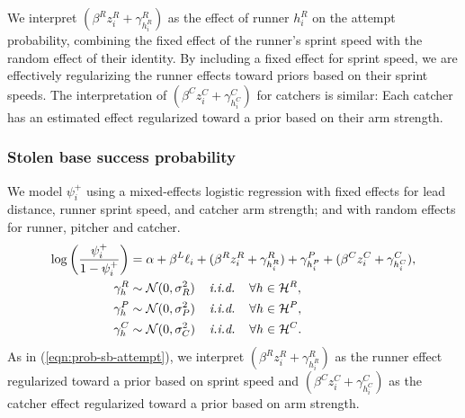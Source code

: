 \documentclass{article}
\begin{document}
        We interpret $(\beta^R z_i^R + \gamma^R_{h_i^R})$ as the effect of runner $h_i^R$ on the attempt probability, combining the fixed effect of the runner's sprint speed with the random effect of their identity. By including a fixed effect for sprint speed, we are effectively regularizing the runner effects toward priors based on their sprint speeds. The interpretation of $(\beta^C z_i^C + \gamma^C_{h_i^C})$ for catchers is similar: Each catcher has an estimated effect regularized toward a prior based on their arm strength.
      
      \subsubsection{Stolen base success probability}
      \label{sec:prob-sb-success}

        We model $\psi_i^+$ using a mixed-effects logistic regression with fixed effects for lead distance, runner sprint speed, and catcher arm strength; and with random effects for runner, pitcher and catcher.
        \begin{align}
          \label{eqn:prob-sb-success}
          \begin{split}
            \log\left(\frac{\psi_i^+}{1 - \psi_i^+}\right) &= \alpha + \beta^L \ell_i + (\beta^R z_i^R + \gamma^R_{h_i^R}) + \gamma^P_{h_i^P} + (\beta^C z_i^C + \gamma^C_{h_i^C}),\\
            \gamma^R_{h} &\sim \mathcal{N}(0, \sigma^2_R) \hspace{4mm} \mbox{\it i.i.d.} \hspace{4mm} \forall h \in \mathcal{H}^R,\\
            \gamma^P_{h} &\sim \mathcal{N}(0, \sigma^2_P) \hspace{4mm} \mbox{\it i.i.d.} \hspace{4mm} \forall h \in \mathcal{H}^P,\\
            \gamma^C_{h} &\sim \mathcal{N}(0, \sigma^2_C) \hspace{4mm} \mbox{\it i.i.d.} \hspace{4mm} \forall h \in \mathcal{H}^C.
          \end{split}
        \end{align}
        As in (\ref{eqn:prob-sb-attempt}), we interpret $(\beta^R z_i^R + \gamma^R_{h_i^R})$ as the runner effect regularized toward a prior based on sprint speed and $(\beta^C z_i^C + \gamma^C_{h_i^C})$ as the catcher effect regularized toward a prior based on arm strength.
\end{document}
